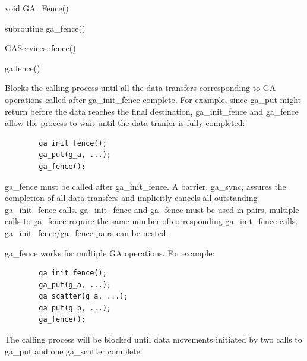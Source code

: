 \documentclass[12pt]{article}
\begin{document}
\begin{capi}
\begin{ccode}
void GA_Fence()
\end{ccode}
\end{capi}

\begin{fapi}
\begin{fcode}
subroutine ga_fence()
\end{fcode}
\end{fapi}

\begin{cxxapi}
\begin{cxxcode}
GAServices::fence()
\end{cxxcode}
\end{cxxapi}

\begin{pyapi}
\begin{pycode}
ga.fence()
\end{pycode}
\end{pyapi}

\ncoll

\begin{desc}

Blocks the calling process until all the data transfers corresponding to GA
operations called after ga_init_fence complete. For example, since ga_put might
return before the data reaches the final destination, ga_init_fence and
ga_fence allow the process to wait until the data tranfer is fully completed:
\begin{verbatim}
        ga_init_fence();
        ga_put(g_a, ...);
        ga_fence();
\end{verbatim}

ga_fence must be called after ga_init_fence. A barrier, ga_sync, assures the
completion of all data transfers and implicitly cancels all outstanding
ga_init_fence calls. ga_init_fence and ga_fence must be used in pairs, multiple
calls to ga_fence require the same number of corresponding ga_init_fence calls.
ga_init_fence/ga_fence pairs can be nested.

ga_fence works for multiple GA operations. For example:
\begin{verbatim}
        ga_init_fence();
        ga_put(g_a, ...);
        ga_scatter(g_a, ...);
        ga_put(g_b, ...);
        ga_fence();
\end{verbatim}

The calling process will be blocked until data movements initiated by two calls
to ga_put and one ga_scatter complete.

\end{desc}
\end{document}
